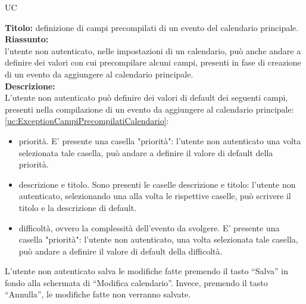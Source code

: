 \begin{listaPersonale}{UC}
\begin{listaPersonale2}[UC] {}
            \textbf{Titolo: } definizione di campi precompilati di un evento del calendario principale. \\
            \textbf{Riassunto: } \\ l'utente non autenticato, nelle impostazioni di un calendario, può anche andare a definire dei valori con cui precompilare alcuni campi, presenti in fase di creazione di un evento da aggiungere al calendario principale. \\
            \textbf{Descrizione: } \\
            L'utente non autenticato può definire dei valori di default dei seguenti campi, presenti nella compilazione di un evento da aggiungere al calendario principale: \ref{uc:ExceptionCampiPrecompilatiCalendario}:
            \begin{itemize}
                \item priorità. E' presente una casella "priorità": l'utente non autenticato una volta selezionata tale casella, può andare a definire il valore di default della priorità.
                \item descrizione e titolo. Sono presenti le caselle descrizione e titolo: l'utente non autenticato, selezionando una alla volta le rispettive caselle, può scrivere il titolo e la descrizione di default.
                \item difficoltà, ovvero la complessità dell'evento da svolgere. E' presente una casella "priorità": l'utente non autenticato, una volta selezionata tale casella, può andare a definire il valore di default della difficoltà.
            \end{itemize}
            L'utente non autenticato salva le modifiche fatte premendo il tasto “Salva” in fondo alla schermata di “Modifica calendario”. Invece, premendo il tasto “Annulla”, le modifiche fatte non verranno salvate.


\end{listaPersonale2}
\end{listaPersonale}
